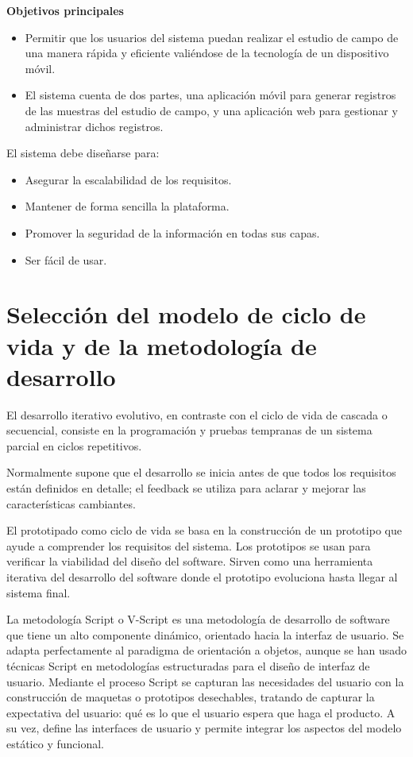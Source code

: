 \textbf{Objetivos principales} 

\begin{itemize}
    \item Permitir que los usuarios del sistema puedan realizar el estudio de campo de una manera rápida y eficiente valiéndose de la tecnología de un dispositivo móvil.
    \item El sistema cuenta de dos partes, una aplicación móvil para generar registros de las muestras del estudio de campo, y una aplicación web para gestionar y administrar dichos registros.
\end{itemize}

El sistema debe diseñarse para:

\begin{itemize}
    \item Asegurar la escalabilidad de los requisitos.
    \item Mantener de forma sencilla la plataforma.
    \item Promover la seguridad de la información en todas sus capas.
    \item Ser fácil de usar.
\end{itemize}

\section{Selección del modelo de ciclo de vida y de la metodología de desarrollo}

El desarrollo iterativo evolutivo, en contraste con el ciclo de vida de cascada o secuencial, consiste en la programación y pruebas tempranas de un sistema parcial en ciclos repetitivos. 

Normalmente supone que el desarrollo se inicia antes de que todos los requisitos están definidos en detalle; el feedback se utiliza para aclarar y mejorar las características cambiantes.

El prototipado como ciclo de vida se basa en la construcción de un prototipo que ayude a comprender los requisitos del sistema. Los prototipos se usan para verificar la viabilidad del diseño del software. Sirven como una herramienta iterativa del desarrollo del software donde el prototipo evoluciona hasta llegar al sistema final. 

La metodología Script o V-Script es una metodología de desarrollo de software que tiene un alto componente dinámico, orientado hacia la interfaz de usuario. Se adapta perfectamente al paradigma de orientación a objetos, aunque se han usado técnicas Script en metodologías estructuradas para el diseño de interfaz de usuario.
Mediante el proceso Script se capturan las necesidades del usuario con la construcción de maquetas o prototipos desechables, tratando de capturar la expectativa del usuario: qué es lo que el usuario espera que haga el producto. A su vez, define las interfaces de usuario y permite integrar los aspectos del modelo estático y funcional.
